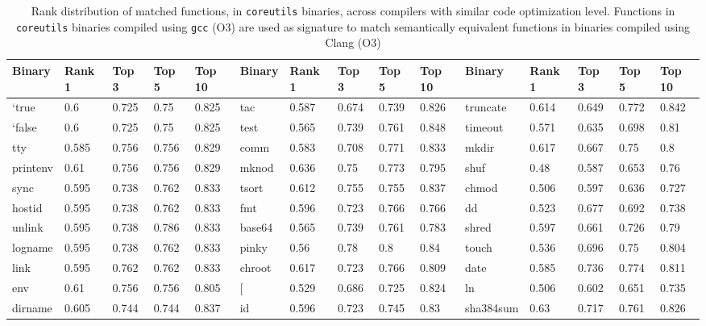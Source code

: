 	
\begin{table*}[h!]
	\begin{center}
		\caption{Rank distribution of matched functions, in \texttt{coreutils} binaries, across compilers with similar code optimization level. Functions in \texttt{coreutils} binaries compiled using \texttt{gcc} (O3) are used as signature to match semantically  equivalent functions in binaries compiled using Clang (O3)\\}
		\label{tab:x86_gcc_clang_O3}
		\scriptsize
\begin{tabular}{ | l | l | l | l | l || l | l | l | l | l || l | l | l | l | l | }
\hline
	Binary & Rank 1 & Top 3 & Top 5 & Top 10 & Binary & Rank 1 & Top 3 & Top 5 & Top 10 & Binary & Rank 1 & Top 3 & Top 5 & Top 10 \\ \hline
	`true & 0.6 & 0.725 & 0.75 & 0.825 & tac & 0.587 & 0.674 & 0.739 & 0.826 & truncate & 0.614 & 0.649 & 0.772 & 0.842 \\ \hline
	`false & 0.6 & 0.725 & 0.75 & 0.825 & test & 0.565 & 0.739 & 0.761 & 0.848 & timeout & 0.571 & 0.635 & 0.698 & 0.81 \\ \hline
	tty & 0.585 & 0.756 & 0.756 & 0.829 & comm & 0.583 & 0.708 & 0.771 & 0.833 & mkdir & 0.617 & 0.667 & 0.75 & 0.8 \\ \hline
	printenv & 0.61 & 0.756 & 0.756 & 0.829 & mknod & 0.636 & 0.75 & 0.773 & 0.795 & shuf & 0.48 & 0.587 & 0.653 & 0.76 \\ \hline
	sync & 0.595 & 0.738 & 0.762 & 0.833 & tsort & 0.612 & 0.755 & 0.755 & 0.837 & chmod & 0.506 & 0.597 & 0.636 & 0.727 \\ \hline
	hostid & 0.595 & 0.738 & 0.762 & 0.833 & fmt & 0.596 & 0.723 & 0.766 & 0.766 & dd & 0.523 & 0.677 & 0.692 & 0.738 \\ \hline
	unlink & 0.595 & 0.738 & 0.786 & 0.833 & base64 & 0.565 & 0.739 & 0.761 & 0.783 & shred & 0.597 & 0.661 & 0.726 & 0.79 \\ \hline
	logname & 0.595 & 0.738 & 0.762 & 0.833 & pinky & 0.56 & 0.78 & 0.8 & 0.84 & touch & 0.536 & 0.696 & 0.75 & 0.804 \\ \hline
	link & 0.595 & 0.762 & 0.762 & 0.833 & chroot & 0.617 & 0.723 & 0.766 & 0.809 & date & 0.585 & 0.736 & 0.774 & 0.811 \\ \hline
	env & 0.61 & 0.756 & 0.756 & 0.805 & [ & 0.529 & 0.686 & 0.725 & 0.824 & ln & 0.506 & 0.602 & 0.651 & 0.735 \\ \hline
	dirname & 0.605 & 0.744 & 0.744 & 0.837 & id & 0.596 & 0.723 & 0.745 & 0.83 & sha384sum & 0.63 & 0.717 & 0.761 & 0.826 \\ \hline

\end{tabular}
\end{center}
\end{table*}
